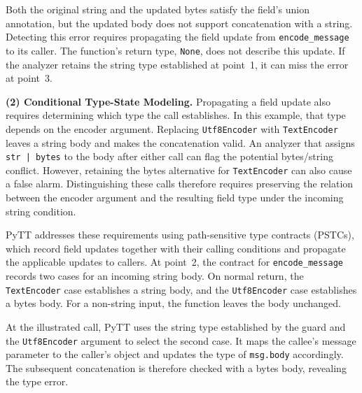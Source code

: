 Both the original string and the updated bytes satisfy the field's
union annotation, but the updated body does not support concatenation
with a string. Detecting this error requires propagating the field
update from \texttt{encode\_message} to its caller. The function's
return type, \texttt{None}, does not describe this update. If the
analyzer retains the string type established at point~1, it can miss
the error at point~3.

\textbf{(2) Conditional Type-State Modeling.}
Propagating a field update also requires determining which type the
call establishes. In this example, that type depends on the encoder
argument. Replacing \texttt{Utf8Encoder} with
\texttt{TextEncoder} leaves a string body and makes the concatenation
valid. An analyzer that assigns \texttt{str | bytes} to the body
after either call can flag the potential bytes/string conflict.
However, retaining the bytes alternative for \texttt{TextEncoder}
can also cause a false alarm. Distinguishing these calls therefore
requires preserving the relation between the encoder argument and the
resulting field type under the incoming string condition.

PyTT addresses these requirements using path-sensitive type contracts
(PSTCs), which record field updates together with their calling
conditions and propagate the applicable updates to callers. At point~2,
the contract for \texttt{encode\_message} records two cases for an
incoming string body. On normal return, the \texttt{TextEncoder}
case establishes a string body, and the \texttt{Utf8Encoder} case
establishes a bytes body. For a non-string input, the function leaves
the body unchanged.

At the illustrated call, PyTT uses the string type established by the
guard and the \texttt{Utf8Encoder} argument to select the second case.
It maps the callee's message parameter to the caller's object and
updates the type of \texttt{msg.body} accordingly. The subsequent
concatenation is therefore checked with a bytes body, revealing the
type error.
